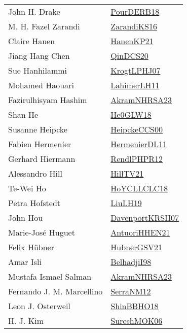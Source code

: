 {\begin{longtable}{p{4cm}p{20cm}}
John H. Drake & \href{articles/PourDERB18.pdf}{PourDERB18}\cite{PourDERB18} \\
M. H. Fazel Zarandi & \href{articles/ZarandiKS16.pdf}{ZarandiKS16}\cite{ZarandiKS16} \\
Claire Hanen & \href{papers/HanenKP21.pdf}{HanenKP21}\cite{HanenKP21} \\
Jiang Hang Chen & \href{articles/QinDCS20.pdf}{QinDCS20}\cite{QinDCS20} \\
Sue Hanhilammi & \href{papers/KrogtLPHJ07.pdf}{KrogtLPHJ07}\cite{KrogtLPHJ07} \\
Mohamed Haouari & \href{papers/LahimerLH11.pdf}{LahimerLH11}\cite{LahimerLH11} \\
Fazirulhisyam Hashim & \href{articles/AkramNHRSA23.pdf}{AkramNHRSA23}\cite{AkramNHRSA23} \\
Shan He & \href{papers/He0GLW18.pdf}{He0GLW18}\cite{He0GLW18} \\
Susanne Heipcke & \href{articles/HeipckeCCS00.pdf}{HeipckeCCS00}\cite{HeipckeCCS00} \\
Fabien Hermenier & \href{papers/HermenierDL11.pdf}{HermenierDL11}\cite{HermenierDL11} \\
Gerhard Hiermann & \href{papers/RendlPHPR12.pdf}{RendlPHPR12}\cite{RendlPHPR12} \\
Alessandro Hill & \href{papers/HillTV21.pdf}{HillTV21}\cite{HillTV21} \\
Te{-}Wei Ho & \href{}{HoYCLLCLC18}\cite{HoYCLLCLC18} \\
Petra Hofstedt & \href{papers/LiuLH19.pdf}{LiuLH19}\cite{LiuLH19} \\
John Hou & \href{papers/DavenportKRSH07.pdf}{DavenportKRSH07}\cite{DavenportKRSH07} \\
Marie{-}Jos{\'{e}} Huguet & \href{papers/AntuoriHHEN21.pdf}{AntuoriHHEN21}\cite{AntuoriHHEN21} \\
Felix H{\"{u}}bner & \href{articles/HubnerGSV21.pdf}{HubnerGSV21}\cite{HubnerGSV21} \\
Amar Isli & \href{articles/BelhadjiI98.pdf}{BelhadjiI98}\cite{BelhadjiI98} \\
Mustafa Ismael Salman & \href{articles/AkramNHRSA23.pdf}{AkramNHRSA23}\cite{AkramNHRSA23} \\
Fernando J. M. Marcellino & \href{papers/SerraNM12.pdf}{SerraNM12}\cite{SerraNM12} \\
Leon J. Osterweil & \href{articles/ShinBBHO18.pdf}{ShinBBHO18}\cite{ShinBBHO18} \\
H. J. Kim & \href{}{SureshMOK06}\cite{SureshMOK06} \\

\end{longtable}}
